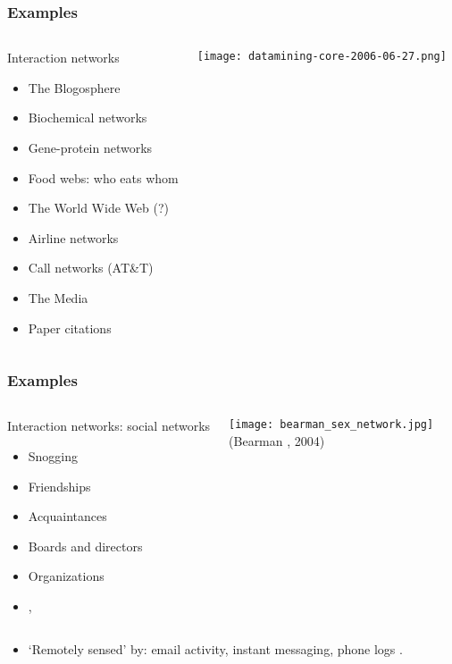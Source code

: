 \begin{frame}
  \frametitle{Examples}

  \begin{columns}
    \begin{block}{Interaction networks}
      \begin{itemize}
      \item<1->  The Blogosphere
      \item<2->  Biochemical networks
      \item<3->  Gene-protein networks
      \item<4->  Food webs: who eats whom
      \item<5->  The World Wide Web (?)
      \item<6->  Airline networks
      \item<7->  Call networks (AT\&T)
      \item<8->  The Media
      \item<9->  Paper citations
      \end{itemize}
    \end{block}
    \texttt{[image: datamining-core-2006-06-27.png]}\\
    {\tiny {}}
  \end{columns}

\end{frame}

\begin{frame}
  \frametitle{Examples}

  \begin{columns}
    \begin{block}{Interaction networks: social networks}
      \begin{itemize}
      \item<1-> Snogging
      \item<2-> Friendships
      \item<3-> Acquaintances
      \item<4-> Boards and directors
      \item<5-> Organizations %
      \item<6-> 
        , 
      \end{itemize}
    \end{block}
    \texttt{[image: bearman\_sex\_network.jpg]}\\
    {\tiny (Bearman \etal, 2004)} 
  \end{columns}

  \begin{itemize}
  \item<7->
  `Remotely sensed' by:
  email activity, 
  instant messaging, 
  phone logs .
  \end{itemize}

\end{frame}

